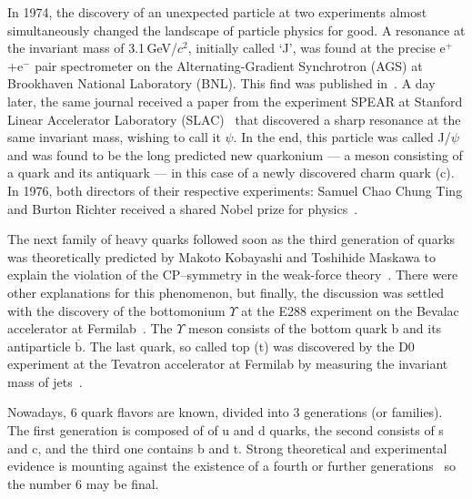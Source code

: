 In 1974, the discovery of an unexpected particle at two experiments almost simultaneously changed the landscape of particle physics for good. A resonance at the invariant mass of 3.1$\,$GeV/$c^2$, initially called `J', was found at the precise e$^+$+e$^-$ pair spectrometer on the Alternating-Gradient Synchrotron (AGS) at Brookhaven National Laboratory (BNL)\@. This find was published in~\cite{JpsiBNL}. A day later, the same journal received a paper from the experiment SPEAR at Stanford Linear Accelerator Laboratory (SLAC)~\cite{JpsiSLAC} that discovered a sharp resonance at the same invariant mass, wishing to call it $\psi$\@. In the end, this particle was called J/$\psi$ and was found to be the long predicted new quarkonium --- a meson consisting of a quark and its antiquark --- in this case of a newly discovered charm quark (c)\@. In 1976, both directors of their respective experiments: Samuel Chao Chung Ting and Burton Richter received a shared Nobel prize for physics~\cite{nobelJpsi}\@.

The next family of heavy quarks followed soon as the third generation of quarks was theoretically predicted by Makoto Kobayashi and Toshihide Maskawa to explain the violation of the CP--symmetry in the weak-force theory~\cite{KobayashiMaskawa}\@. There were other explanations for this phenomenon, but finally, the discussion was settled with the discovery of the bottomonium $\Upsilon$ at the E288 experiment on the Bevalac accelerator at Fermilab~\cite{bottomDiscovery}\@. The $\Upsilon$ meson consists of the bottom quark b and its antiparticle $\overline{\mathrm{b}}$\@. The last quark, so called top (t) was discovered by the D0 experiment at the Tevatron accelerator at Fermilab by measuring the invariant mass of jets~\cite{topQuark}. 

Nowadays, 6 quark flavors are known, divided into 3 generations (or families)\@. The first generation is composed of of u and d quarks, the second consists of s and c, and the third one contains b and t. Strong theoretical and experimental evidence is mounting against the existence of a fourth or further generations~\cite{fourGensPhysLettB,fourGensPRL} so the number 6 may be final.

